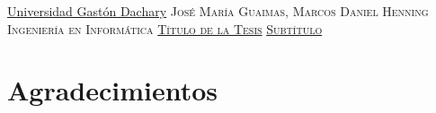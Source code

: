 \documentclass[a4paper,12pt]{report}
\newcommand{\linespacing}{1.5}
\renewcommand{\baselinestretch}{\linespacing}
\begin{document}
\thispagestyle{empty}
\newpage
\null\vskip10mm
\begin{center}
\large
\underline{Universidad Gastón Dachary}
\vskip20mm
\textsc{José María Guaimas, Marcos Daniel Henning}\\
\textsc{Ingeniería en Informática}
\vskip20mm
\underline{\textsc{Título de la Tesis}}
\vskip0mm
\underline{\textsc{Subtítulo}}
\vskip20mm
\vskip2mm
\end{center}
\renewcommand{\baselinestretch}{1.0}
\small\normalsize

\thispagestyle{empty}


\chapter*{Agradecimientos}
\renewcommand{\baselinestretch}{\linespacing}
\small\normalsize

\thispagestyle{empty}


\newpage
{}
\tableofcontents

\thispagestyle{empty}
\newpage
{}


%






%
%
%



\end{document}
